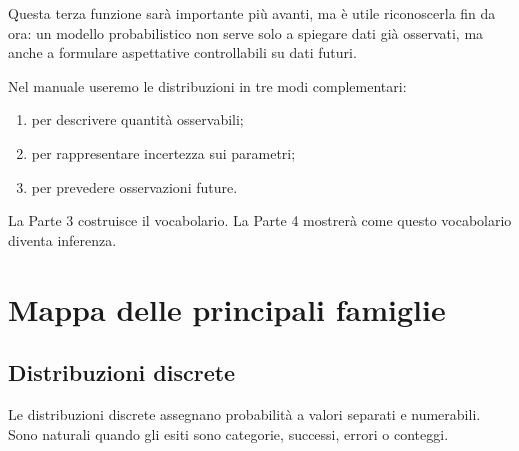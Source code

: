 \documentclass[
  italian,
  letterpaper,
  a4paper,
  11pt,
  open=any]{scrbook}
\providecommand{\tightlist}{%
  \setlength{\itemsep}{0pt}\setlength{\parskip}{0pt}}
\theoremstyle{plain}
\theoremstyle{definition}
\theoremstyle{definition}
\theoremstyle{remark}
\begin{document}
Questa terza funzione sarà importante più avanti, ma è utile
riconoscerla fin da ora: un modello probabilistico non serve solo a
spiegare dati già osservati, ma anche a formulare aspettative
controllabili su dati futuri.

\begin{tcolorbox}[enhanced jigsaw, arc=.35mm, bottomrule=.15mm, bottomtitle=1mm, breakable, colback=white, colbacktitle=quarto-callout-important-color!10!white, colframe=quarto-callout-important-color-frame, coltitle=black, left=2mm, leftrule=.75mm, opacityback=0, opacitybacktitle=0.6, rightrule=.15mm, title=\textcolor{quarto-callout-important-color}{\faExclamation}\hspace{0.5em}{Idea guida}, titlerule=0mm, toprule=.15mm, toptitle=1mm]

Nel manuale useremo le distribuzioni in tre modi complementari:

\begin{enumerate}
\def\labelenumi{\arabic{enumi}.}
\tightlist
\item
  per descrivere quantità osservabili;
\item
  per rappresentare incertezza sui parametri;
\item
  per prevedere osservazioni future.
\end{enumerate}

La Parte 3 costruisce il vocabolario. La Parte 4 mostrerà come questo
vocabolario diventa inferenza.

\end{tcolorbox}

\section{Mappa delle principali
famiglie}\label{sec-map-distribution-families}

\subsection{Distribuzioni discrete}\label{distribuzioni-discrete}

Le distribuzioni discrete assegnano probabilità a valori separati e
numerabili. Sono naturali quando gli esiti sono categorie, successi,
errori o conteggi.
\end{document}
